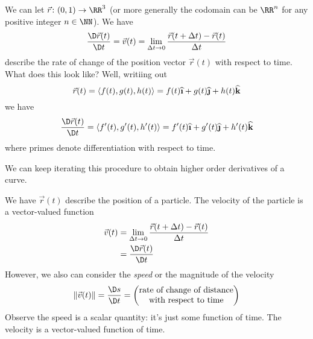 \M
We can let $\vec{r}\colon(0,1)\to\RR^{3}$ (or more generally the
codomain can be $\RR^{n}$ for any positive integer $n\in\NN$). We
have
\begin{equation}
\frac{\D\vec{r}(t)}{\D t}=\vec{v}(t) = \lim_{\Delta t\to0}\frac{\vec{r}(t+\Delta t)-\vec{r}(t)}{\Delta t}
\end{equation}
describe the rate of change of the position vector $\vec{r}(t)$
with respect to time. What does this look like? Well, writiing out
\begin{equation}
\vec{r}(t) = \langle f(t),g(t),h(t)\rangle =
f(t)\widehat{\textbf{\i}} +
g(t)\widehat{\textbf{\j}} +
h(t)\widehat{\textbf{k}}
\end{equation}
we have
\begin{equation}
\frac{\D\vec{r}(t)}{\D t} = \langle f'(t), g'(t), h'(t)\rangle =
f'(t)\widehat{\textbf{\i}} +
g'(t)\widehat{\textbf{\j}} +
h'(t)\widehat{\textbf{k}}
\end{equation}
where primes denote differentiation with respect to time.

\begin{remark}
We can keep iterating this procedure to obtain higher order
derivatives of a curve.
\end{remark}

We have $\vec{r}(t)$ describe the position of a particle. The
velocity of the particle is a vector-valued function
\begin{equation}
\begin{aligned}
\vec{v}(t)
&=\lim_{\Delta t\to 0}\frac{\vec{r}(t+\Delta
  t)-\vec{r}(t)}{\Delta t}\\
&=\frac{\D\vec{r}(t)}{\D t}
\end{aligned}
\end{equation}
However, we also can consider the \emph{speed} or the magnitude
of the velocity
\begin{equation}
\|\vec{v}(t)\|=\frac{\D s}{\D t} = \begin{pmatrix}
\mbox{rate of change of distance}\\
\mbox{with respect to time}
\end{pmatrix}
\end{equation}
Observe the speed is a scalar quantity: it's just some function
of time. The velocity is a vector-valued function of time. 

